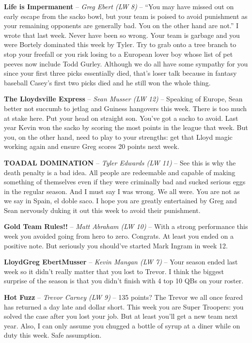 \documentclass[11pt,letterpaper]{article}
\begin{document}
\newpage
{}
\begin{etaremune}
\item \textbf{Life is Impermanent} -- \textit{Greg Ebert (LW 8)} -- ``You may have missed out on early escape from the sacko bowl, but your team is poised to avoid punishment as your remaining opponents are generally bad. You on the other hand are not.'' I wrote that last week. Never have been so wrong. Your team is garbage and you were Bortely dominated this week by Tyler. Try to grab onto a tree branch to stop your freefall or you risk losing to a European lover boy whose list of pet peeves now include Todd Gurley. Although we do all have some sympathy for you since your first three picks essentially died, that's loser talk because in fantasy baseball Casey's first two picks died and he still won the whole thing. 
\item \textbf{The Lloydsville Express} -- \textit{Sean Musser (LW 12)} -- Speaking of Europe, Sean better not succumb to jetlag and Guiness hangovers this week. There is too much at stake here. Put your head on straight son. You've got a sacko to avoid. Last year Kevin won the sacko by scoring the most points in the league that week. But you, on the other hand, need to play to your strengths: get that Lloyd magic working again and ensure Greg scores 20 points next week.
\item \textbf{TOADAL DOMINATION} -- \textit{Tyler Edwards (LW 11)} -- See this is why the death penalty is a bad idea. All people are redeemable and capable of making something of themselves even if they were criminally bad and sucked serious eggs in the regular season. And I must say I was wrong. We all were. You are not as we say in Spain, el doble saco. I hope you are greatly entertained by Greg and Sean nervously duking it out this week to avoid their punishment. 
\item \textbf{Gold Team Rules!!} -- \textit{Matt Abraham (LW 10)} -- With a strong performance this week you avoided going from hero to zero. Congrats. At least you ended on a positive note. But seriously you should've started Mark Ingram in week 12. 
\item \textbf{LloydGreg EbertMusser} -- \textit{Kevin Mangan (LW 7)} -- Your season ended last week so it didn't really matter that you lost to Trevor. I think the biggest surprise of the season is that you didn't finish with 4 top 10 QBs on your roster. 
\item \textbf{Hot Fuzz} -- \textit{Trevor Carney (LW 9)} -- 135 points? The Trevor we all once feared has returned a day late and dollar short. This week you are Super Troopers: you solved the case after you lost your job. But at least you'll get a new team next year. Also, I can only assume you chugged a bottle of syrup at a diner while on duty this week. Safe assumption.

\end{etaremune}
\end{document}
